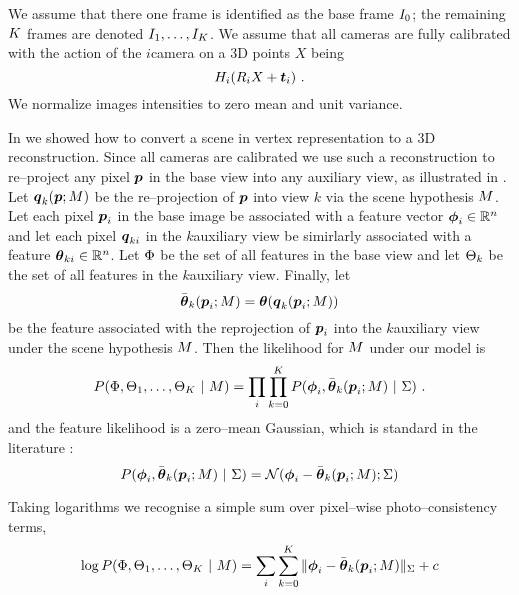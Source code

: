 We assume that there one frame is identified as the base frame
$\Image_0$; the remaining $\NumViews$ frames are denoted
$\Image_1,\ldots,\Image_{\NumViews}$. We assume that all cameras are fully
calibrated with the action of the $i$\th camera on a 3D points $X$
being
\begin{equation}
  \CamMatrix_i (\CamR_i X + \CamTr_i) ~.
\end{equation}
We normalize images intensities to zero mean and unit variance.

In  we showed how to convert a scene in vertex
representation to a 3D reconstruction. Since all cameras are
calibrated we use such a reconstruction to re--project any pixel
$\Pixel$ in the base view into any auxiliary view, as illustrated in
. Let $\AuxPixel_k(\Pixel;\Scene)$ be the
re--projection of $\Pixel$ into view $k$ via the scene hypothesis
$\Scene$. Let each pixel $\Pixel_i$ in the base image be associated
with a feature vector $\Feature_i\in\Reals^n$ and let each pixel
$\AuxPixel_{ki}$ in the $k$\th auxiliary view be simirlarly associated
with a feature $\AuxFeature_{ki}\in\Reals^n$. Let $\Features$ be the
set of all features in the base view and let $\AuxFeatures_k$ be the
set of all features in the $k$\th auxiliary view. Finally, let
\begin{equation}
  \ComputedAuxFeature_k(\Pixel_i;\Scene) =
  \AuxFeature(\AuxPixel_k(\Pixel_i;\Scene))
\end{equation}
be the feature associated with the reprojection of $\Pixel_i$ into the
$k$\th auxiliary view under the scene hypothesis $\Scene$. Then the
likelihood for $\Scene$ under our model is
\begin{equation}
  P(\Features,\AuxFeatures_1,\ldots,\AuxFeatures_K ~|~ \Scene) =
    \prod_i \prod_{k=0}^{\NumViews} 
      P(\Feature_i, \ComputedAuxFeature_k(\Pixel_i;\Scene) ~|~ \StereoCov)~.
\end{equation}
and the feature likelihood is a zero--mean Gaussian, which is standard in
the literature \cite{Scharstein01}:
\begin{equation}
  P(\Feature_i, \ComputedAuxFeature_k(\Pixel_i;\Scene) ~|~ \StereoCov)
   = \NormalDistr(\Feature_i-\ComputedAuxFeature_k(\Pixel_i;\Scene); \StereoCov)
\end{equation}

Taking logarithms we recognise a simple sum over pixel--wise
photo--consistency terms,
\begin{equation}
  \label{eq:stereo-loglik}
  \log P(\Features,\AuxFeatures_1,\ldots,\AuxFeatures_{\NumViews}
            ~|~ \Scene) =
  \sum_i \sum_{k=0}^{\NumViews} 
    \|\Feature_i-\ComputedAuxFeature_k(\Pixel_i;\Scene)\|_{\StereoCov}
   +c
\end{equation}

